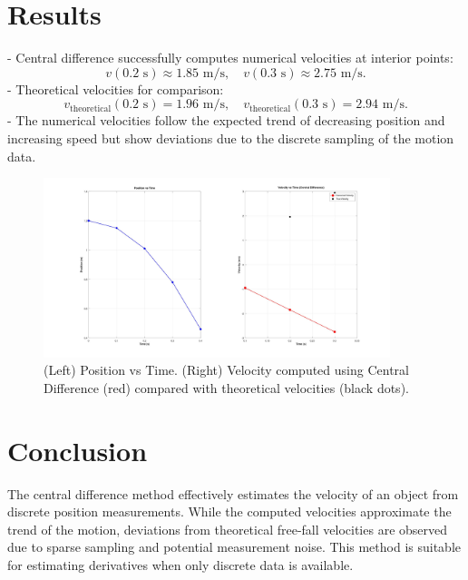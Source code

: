 \section*{Results}
- Central difference successfully computes numerical velocities at interior points:
\[
v(0.2 \text{ s}) \approx 1.85 \text{ m/s}, \quad
v(0.3 \text{ s}) \approx 2.75 \text{ m/s}.
\]
- Theoretical velocities for comparison:
\[
v_\text{theoretical}(0.2 \text{ s}) = 1.96 \text{ m/s}, \quad
v_\text{theoretical}(0.3 \text{ s}) = 2.94 \text{ m/s}.
\]
- The numerical velocities follow the expected trend of decreasing position and increasing speed but show deviations due to the discrete sampling of the motion data.

\begin{figure}[h!]
  \centering
  \includegraphics[width=0.9\textwidth]{a4.jpg}
  \caption{(Left) Position vs Time. (Right) Velocity computed using Central Difference (red) compared with theoretical velocities (black dots).}
\end{figure}

\section*{Conclusion}
The central difference method effectively estimates the velocity of an object from discrete position measurements. While the computed velocities approximate the trend of the motion, deviations from theoretical free-fall velocities are observed due to sparse sampling and potential measurement noise. This method is suitable for estimating derivatives when only discrete data is available.
